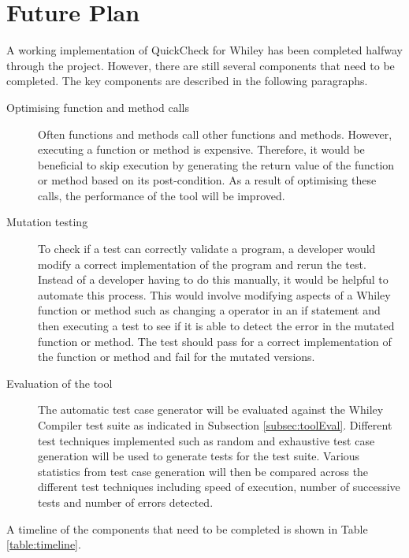 \section{Future Plan}\label{section:future}


A working implementation of QuickCheck for Whiley has been completed halfway through the project. However, there are still several components that need to be completed. The key components are described in the following paragraphs.

\begin{description}
	\item[Optimising function and method calls]
	Often functions and methods call other functions and methods.
	However, executing a function or method is expensive.
	Therefore, it would be beneficial to skip execution by generating the return value of the function or method based on its post-condition.
	As a result of optimising these calls, the performance of the tool will be improved.
	\item[Mutation testing]
	To check if a test can correctly validate a program, a developer would modify a correct implementation of the program and rerun the test.
	Instead of a developer having to do this manually, it would be helpful to automate this process.
	This would involve modifying aspects of a Whiley function or method such as changing a operator in an if statement and then executing a test to see if it is able to detect the error in the mutated function or method.
	The test should pass for a correct implementation of the function or method and fail for the mutated versions.
	\item[Evaluation of the tool] The automatic test case generator will be evaluated against the Whiley Compiler test suite as indicated in Subsection \ref{subsec:toolEval}. Different test techniques implemented such as random and exhaustive test case generation will be used to generate tests for the test suite. Various statistics from test case generation will then be compared across the different test techniques including speed of execution, number of successive tests and number of errors detected.
\end{description}

A timeline of the components that need to be completed is shown in Table \ref{table:timeline}.

